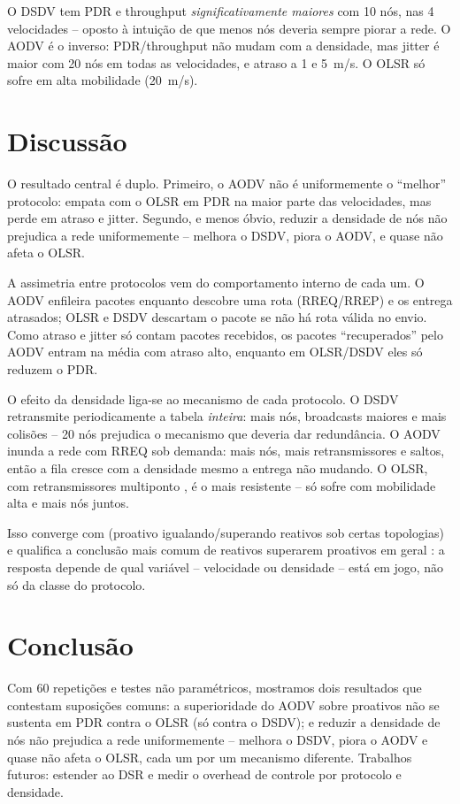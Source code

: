 \documentclass[12pt]{article}
\begin{document}
O DSDV tem PDR e throughput \emph{significativamente maiores} com 10 nós, nas 4 velocidades -- oposto à intuição de que menos nós deveria sempre piorar a rede. O AODV é o inverso: PDR/throughput não mudam com a densidade, mas jitter é maior com 20 nós em todas as velocidades, e atraso a 1 e 5~m/s. O OLSR só sofre em alta mobilidade (20~m/s).

\vspace{3mm}
\section{Discussão}
\label{sec:discussao}

O resultado central é duplo. Primeiro, o AODV não é uniformemente o ``melhor'' protocolo: empata com o OLSR em PDR na maior parte das velocidades, mas perde em atraso e jitter. Segundo, e menos óbvio, reduzir a densidade de nós não prejudica a rede uniformemente -- melhora o DSDV, piora o AODV, e quase não afeta o OLSR.

A assimetria entre protocolos vem do comportamento interno de cada um. O AODV enfileira pacotes enquanto descobre uma rota (RREQ/RREP) e os entrega atrasados; OLSR e DSDV descartam o pacote se não há rota válida no envio. Como atraso e jitter só contam pacotes recebidos, os pacotes ``recuperados'' pelo AODV entram na média com atraso alto, enquanto em OLSR/DSDV eles só reduzem o PDR.

O efeito da densidade liga-se ao mecanismo de cada protocolo. O DSDV retransmite periodicamente a tabela \emph{inteira}: mais nós, broadcasts maiores e mais colisões -- 20 nós prejudica o mecanismo que deveria dar redundância. O AODV inunda a rede com RREQ sob demanda: mais nós, mais retransmissores e saltos, então a fila cresce com a densidade mesmo a entrega não mudando. O OLSR, com retransmissores multiponto \cite{alzahrani2020}, é o mais resistente -- só sofre com mobilidade alta e mais nós juntos.

Isso converge com \cite{alkhatib2018} (proativo igualando/superando reativos sob certas topologias) e qualifica a conclusão mais comum de reativos superarem proativos em geral \cite{quadri2025,arunkumar2008,shrivastava2021}: a resposta depende de qual variável -- velocidade ou densidade -- está em jogo, não só da classe do protocolo.

\vspace{3mm}
\section{Conclusão}

Com 60 repetições e testes não paramétricos, mostramos dois resultados que contestam suposições comuns: a superioridade do AODV sobre proativos não se sustenta em PDR contra o OLSR (só contra o DSDV); e reduzir a densidade de nós não prejudica a rede uniformemente -- melhora o DSDV, piora o AODV e quase não afeta o OLSR, cada um por um mecanismo diferente. Trabalhos futuros: estender ao DSR e medir o overhead de controle por protocolo e densidade.

\vspace{3mm}


\end{document}
